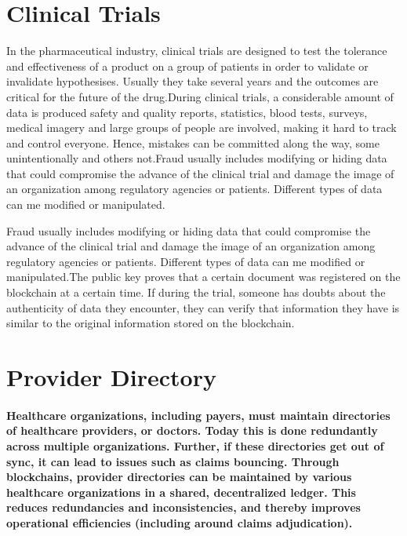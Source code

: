 \documentclass[12pt]{report}
\begin{document}
\section{Clinical Trials}
In the pharmaceutical industry, clinical trials are designed to test the tolerance and effectiveness of a product on a group of patients in order to validate or invalidate hypothesises. Usually they take several years and the outcomes are critical for the future of the drug.During clinical trials, a considerable amount of data is produced safety and quality reports, statistics, blood tests, surveys, medical imagery and large groups of people are involved, making it hard to track and control everyone\cite{17}. Hence, mistakes can be committed along the way, some unintentionally and others not.Fraud usually includes modifying or hiding data that could compromise the advance of the clinical trial and damage the image of an organization among regulatory agencies or patients. Different types of data can me modified or manipulated.
\par Fraud usually includes modifying or hiding data that could compromise the advance of the clinical trial and damage the image of an organization among regulatory agencies or patients. Different types of data can me modified or manipulated.The public key proves that a certain document was registered on the blockchain at a certain time. If during the trial, someone has doubts about the authenticity of data they encounter, they can verify that information they have is similar to the original information stored on the blockchain.

\section{Provider Directory}
\paragraph{Healthcare organizations, including payers, must maintain directories of healthcare providers, or doctors. Today this is done redundantly across multiple organizations. Further, if these directories get out of sync, it can lead to issues such as claims bouncing. Through blockchains, provider directories can be maintained by various healthcare organizations in a shared, decentralized ledger. This reduces redundancies and inconsistencies, and thereby improves operational efficiencies (including around claims adjudication).}
\end{document}
